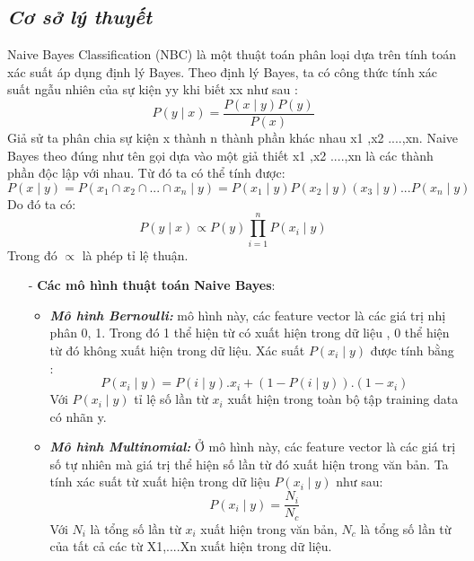 \documentclass{report}
\begin{document}
\subsection{\textit{Cơ sở lý thuyết}}
    \fontsize{13}{14}\selectfont
    Naive Bayes Classification (NBC) là một thuật toán phân loại dựa trên tính toán xác suất áp dụng định lý Bayes. Theo định lý Bayes, ta có công thức tính xác suất ngẫu nhiên của sự kiện yy khi biết xx như sau :
     $$P(y \mid x)=\frac {P(x \mid y) P(y)} {P(x)} $$
    \indent Giả sử ta phân chia sự kiện x thành n thành phần khác nhau x1 ,x2 ....,xn. Naive Bayes theo đúng như tên gọi dựa vào một giả thiết x1 ,x2 ....,xn  là các thành phần độc lập với nhau. Từ đó ta có thể tính được:
    $$P(x \mid y)=P(x_1 \cap x_2 \cap ... \cap x_n \mid y) = P(x_1 \mid y)P(x_2 \mid y)(x_3 \mid y)...P(x_n \mid y) $$
    \indent Do đó ta có:
    $$ P(y \mid x) \propto P(y) \prod_{i=1}^{n}P(x_i \mid y) $$
    Trong đó $ \propto$ là phép tỉ lệ thuận.
 \begin{enumerate}
                \item[- ] \textbf{Các mô hình thuật toán Naive Bayes}:
                    \begin{itemize}
                        \item \textbf {\textit{Mô hình Bernoulli:}} mô hình này, các feature vector là các giá trị nhị phân 0, 1. Trong đó 1 thể hiện từ có xuất hiện trong dữ liệu , 0 thể hiện từ đó không xuất hiện trong dữ liệu. Xác suất $P (x_i \mid y )$ được tính bằng :
                        $$ P(x_i \mid y)=P(i \mid y).x_i+(1-P(i \mid y)).(1-x_i)$$
                        Với $P (x_i \mid y )$ tỉ lệ số lần từ $x_i$ xuất hiện trong toàn bộ tập training data có nhãn y.
                        \item \textbf{\textit{Mô hình Multinomial: }}Ở mô hình này, các feature vector là các giá trị số tự nhiên mà giá trị thể hiện số lần từ đó xuất hiện trong văn bản. Ta tính xác suất từ xuất hiện trong dữ liệu $P (x_i \mid y )$ như sau:
                        $$P(x_i \mid y)=\frac{N_i}{N_c}$$
                        Với $N_i$ là tổng số lần từ $x_i$ xuất hiện trong văn bản, $N_c$ là tổng số lần từ của tất cả các từ X1,....Xn xuất hiện trong dữ liệu.
                    \end{itemize}
\end{enumerate}
\end{document}
